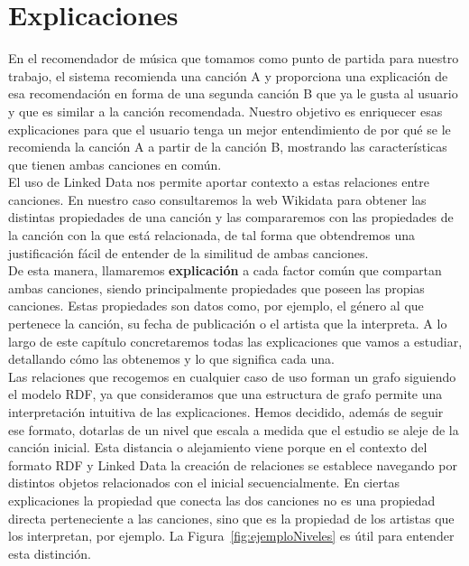 \chapter{Explicaciones}
\label{cap:explicaciones}

En el recomendador de música que tomamos como punto de partida para nuestro trabajo, el sistema recomienda una canción A y proporciona una explicación de esa recomendación en forma de una segunda canción B que ya le gusta al usuario y que es similar a la canción recomendada. Nuestro objetivo es enriquecer esas explicaciones para que el usuario tenga un mejor entendimiento de por qué se le recomienda la canción A a partir de la canción B, mostrando las características que tienen ambas canciones en común.\\

El uso de Linked Data nos permite aportar contexto a estas relaciones entre canciones. En nuestro caso consultaremos la web Wikidata para obtener las distintas propiedades de una canción y las compararemos con las propiedades de la canción con la que está relacionada, de tal forma que obtendremos una justificación fácil de entender de la similitud de ambas canciones.\\

De esta manera, llamaremos \textbf{explicación} a cada factor común que compartan ambas canciones, siendo principalmente propiedades que poseen las propias canciones. Estas propiedades son datos como, por ejemplo, el género al que pertenece la canción, su fecha de publicación o el artista que la interpreta. A lo largo de este capítulo concretaremos todas las explicaciones que vamos a estudiar, detallando cómo las obtenemos y lo que significa cada una.\\

Las relaciones que recogemos en cualquier caso de uso forman un grafo siguiendo el modelo RDF, ya que consideramos que una estructura de grafo permite una interpretación intuitiva de las explicaciones. Hemos decidido, además de seguir ese formato, dotarlas de un nivel que escala a medida que el estudio se aleje de la canción inicial. Esta distancia o alejamiento viene porque en el contexto del formato RDF y Linked Data la creación de relaciones se establece navegando por distintos objetos relacionados con el inicial secuencialmente. En ciertas explicaciones la propiedad que conecta las dos canciones no es una propiedad directa perteneciente a las canciones, sino que es la propiedad de los artistas que los interpretan, por ejemplo. La Figura~\ref{fig:ejemploNiveles} es útil para entender esta distinción.\\

